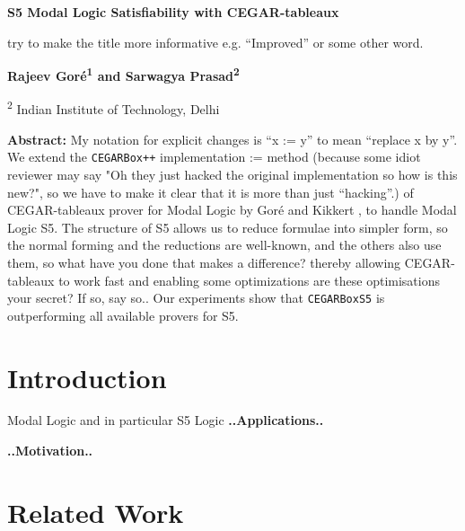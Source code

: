 \documentclass{article}
\newcommand{\raj}[1]{{\color{blue}#1\color{black}}}
\begin{document}
\begin{center}
  {\huge\bfseries S5 Modal Logic Satisfiability with CEGAR-tableaux\par\vspace{\baselineskip}
  \raj{try to make the title more informative e.g. ``Improved'' or some other word.}}
{\Large \bfseries Rajeev Gor\'e\textsuperscript{1} and Sarwagya Prasad\textsuperscript{2}
\par\vspace{\baselineskip}}
\textsuperscript{2} Indian Institute of Technology, Delhi\par
\end{center}

\begin{center}
    \begin{minipage}{0.7\textwidth}
      \textbf{Abstract: }
      \raj{My notation for explicit changes is ``x := y'' to mean ``replace x by y''.}
      We extend the \verb|CEGARBox++| \raj{implementation := method (because some idiot reviewer may say "Oh
        they just hacked the original implementation so how is this new?", so we have to make it clear that it is more than just
        ``hacking''.)} of CEGAR-tableaux prover for Modal Logic by Gor\'e and Kikkert \cite{GoreKikkert21}, to handle Modal Logic
      S5. The structure of S5 allows us to reduce formulae into simpler form, \raj{so the normal forming and the reductions are well-known, and the others also use them, so what have you done that makes a difference?} thereby allowing CEGAR-tableaux to work fast and
      enabling some optimizations \raj{are these optimisations your secret? If so, say so.}. Our experiments show that \verb|CEGARBoxS5| is outperforming all available provers for S5.
    \end{minipage}
\end{center}

\tableofcontents
\newpage

\section{Introduction}
%

Modal Logic and in particular S5 Logic \textbf{..Applications..}

\textbf{..Motivation..}
\section{Related Work}
%
\end{document}
